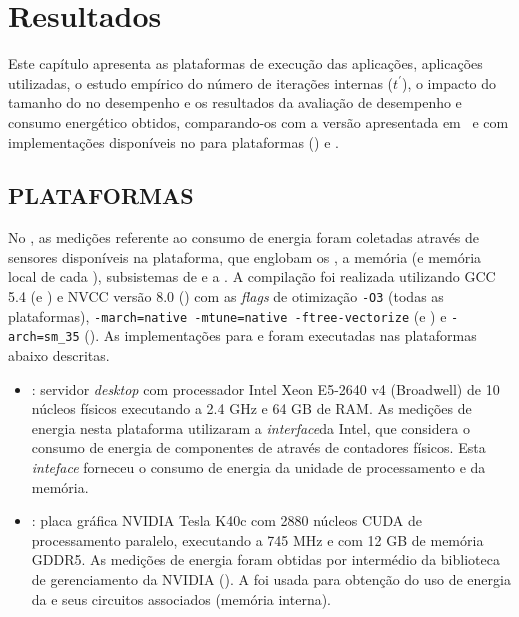 %

\chapter{Resultados}
\label{cap:resultados}

Este capítulo apresenta as plataformas de execução das aplicações, aplicações utilizadas, o estudo empírico do número de iterações internas ($t^\prime$), o impacto do tamanho do \tile no desempenho e os resultados da avaliação de desempenho e consumo energético obtidos, comparando-os com a versão \ipc apresentada em~\cite{Podesta:TCC} e com implementações disponíveis no \pskel para plataformas \multicore (\cpu) e \gpu.

\section{PLATAFORMAS}
\label{sec:plataformas}

No \mppa, as medições referente ao consumo de energia foram coletadas através de sensores disponíveis na plataforma, que englobam os \clusters, a memória (\lpddr e memória local de cada \cluster), subsistemas de \io e a \noc. A compilação foi realizada utilizando GCC 5.4 (\mppa e \cpu) e NVCC versão 8.0 (\gpu) com as \textit{flags} de otimização \texttt{-O3} (todas as plataformas), \texttt{-march=native -mtune=native -ftree-vectorize} (\cpu e \gpu) e \texttt{-arch=sm\_35} (\gpu). As implementações para \cpu e \gpu foram executadas nas plataformas abaixo descritas.

\begin{itemize}

  \item \textbf{\xeon}: servidor \textit{desktop} com processador Intel Xeon E5-2640 v4 (Broadwell) de 10 núcleos físicos executando a 2.4 GHz e 64 GB de RAM. As medições de energia nesta plataforma utilizaram a \textit{interface}\rapl da Intel, que considera o consumo de energia de componentes de \hw através de contadores físicos. Esta \textit{inteface} forneceu o consumo de energia da unidade de processamento e da memória.

  \item \textbf{\tesla}: placa gráfica NVIDIA Tesla K40c com 2880 núcleos CUDA de processamento paralelo, executando a 745 MHz e com 12 GB de memória GDDR5. As medições de energia foram obtidas por intermédio da biblioteca de gerenciamento da NVIDIA (\nvml). A \nvml foi usada para obtenção do uso de energia da \gpu e seus circuitos associados (\eg memória interna).

\end{itemize}

